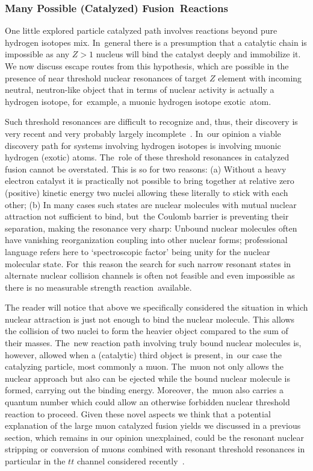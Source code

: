 \documentclass[particles,article,accept,pdftex,moreauthors]{Definitions/mdpi}
\begin{document}
\subsubsection{Many Possible (Catalyzed) Fusion~Reactions}\label{sssec:ManyFusions}
One little explored particle catalyzed path involves reactions beyond pure hydrogen isotopes mix. In~general there is a presumption that a catalytic chain is impossible as any $Z>1$ nucleus will bind the catalyst deeply and immobilize it. We now discuss escape routes from this hypothesis, which are possible in the presence of near threshold nuclear resonances of target $Z$ element with incoming neutral, neutron-like object that in terms of nuclear activity is actually a hydrogen isotope, for~example, a muonic hydrogen isotope exotic~atom.

Such threshold resonances are difficult to recognize and, thus, their discovery is very recent and very probably largely incomplete~\cite{Aprahamian:2025AA}. In~our opinion a viable discovery path for systems involving hydrogen isotopes is involving muonic hydrogen (exotic) atoms. The~role of these threshold resonances in catalyzed fusion cannot be overstated. This is so for two reasons: (a) Without a heavy electron catalyst it is practically not possible to bring together at relative zero (positive) kinetic energy two nuclei allowing these literally to stick with each other; (b) In many cases such states are nuclear molecules with mutual nuclear attraction not sufficient to bind, but~the Coulomb barrier is preventing their separation, making the resonance very sharp: Unbound nuclear molecules often have vanishing reorganization coupling into other nuclear forms; professional language refers here to `spectroscopic factor' being unity for the nuclear molecular state. For~this reason the search for such narrow resonant states in alternate nuclear collision channels is often not feasible and even impossible as there is no measurable strength reaction~available.

The reader will notice that above we specifically considered the situation in which nuclear attraction is just not enough to bind the nuclear molecule. This allows the collision of two nuclei to form the heavier object compared to the sum of their masses. The~new reaction path involving truly bound nuclear molecules is, however, allowed when a (catalytic) third object is present, in~our case the catalyzing particle, most commonly a muon. The~muon not only allows the nuclear approach but also can be ejected while the bound nuclear molecule is formed, carrying out the binding energy. Moreover, the~muon also carries a quantum number which could allow an otherwise forbidden nuclear threshold reaction to proceed. Given these novel aspects we think that a potential explanation of the large muon catalyzed fusion yields we discussed in a previous section, which remains in our opinion unexplained, could be the resonant nuclear stripping or conversion of muons combined with resonant threshold resonances in particular in the $tt$ channel considered recently~\cite{Aprahamian:2025AA}.
\end{document}
